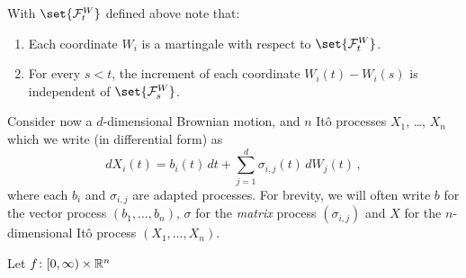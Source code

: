 With $\set{\mathcal F_t^W}$ defined above note that:
\begin{enumerate}
  \item
    Each coordinate $W_i$ is a martingale with respect to $\set{\mathcal F_t^W}$.

  \item
    For every $s < t$, the increment of each coordinate $W_i(t) - W_i(s)$ is independent of $\set{\mathcal F_s^W}$.
\end{enumerate}

Consider now a $d$-dimensional Brownian motion, and $n$ It\^o processes $X_1$, \dots, $X_n$ which we write (in differential form) as
\begin{equation*}
  dX_i(t) = b_i(t) \, dt + \sum_{j=1}^{d} \sigma_{i,j}(t) \, dW_j(t)\,,
\end{equation*}
where each $b_i$ and $\sigma_{i,j}$ are adapted processes.
For brevity, we will often write $b$ for the vector process $(b_1, \dots, b_n)$, $\sigma$ for the \emph{matrix} process $(\sigma_{i,j})$ and $X$ for the $n$-dimensional It\^o process $(X_1, \dots, X_n)$.
\begin{theorem}
  Let $f\colon [0, \infty)\times \mathbb{R}^n$
\end{theorem}


